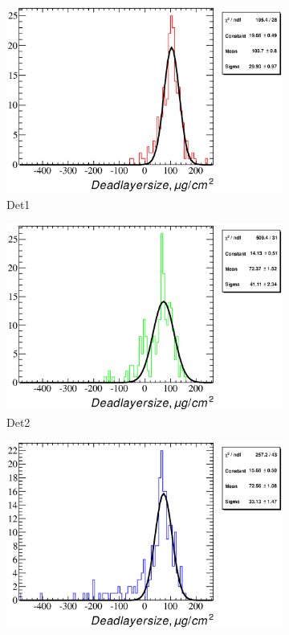 \documentclass[a4paper,12pt]{article}
\begin{document}
\begin{figure}
\begin{subfigure}[b]{0.325\textwidth}
\includegraphics[width=\textwidth]{gfx/run13_alpha_study_novoltagevariation/Y2U/c_hDeadLayerSize_by_run_distribution1_Y2U.eps}
\caption{Det1}
\end{subfigure}
\hfill
\begin{subfigure}[b]{0.325\textwidth}
\includegraphics[width=\textwidth]{gfx/run13_alpha_study_novoltagevariation/Y2U/c_hDeadLayerSize_by_run_distribution2_Y2U.eps}
\caption{Det2}
\end{subfigure}
\hfill
\begin{subfigure}[b]{0.325\textwidth}
\includegraphics[width=\textwidth]{gfx/run13_alpha_study_novoltagevariation/Y2U/c_hDeadLayerSize_by_run_distribution3_Y2U.eps}

\end{subfigure}
\end{figure}
\end{document}
